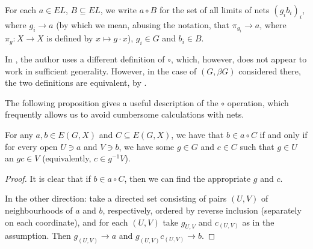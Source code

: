 	
	\begin{dfn}
		\label{dfn:circ}
		For each $a\in EL$, $B\subseteq EL$, we write $a\circ B$ for the set of all limits of nets $(g_ib_i)_i$, where $g_i\to a$ (by which we mean, abusing the notation, that $\pi_{g_i}\to a$, where $\pi_g\colon X\to X$ is defined by $x\mapsto g\cdot x$), $g_i\in G$ and $b_i\in B$.\xqed{\lozenge}
	\end{dfn}
	\begin{rem}
		\label{rem:circ_equivalence}
		In \cite{Gl76}, the author uses a different definition of $\circ$, which, however, does not appear to work in sufficient generality. However, in the case of $(G,\beta G)$ considered there, the two definitions are equivalent, by \cite[Lemma 1.1(1), \S IX.1.]{Gl76}.
		\xqed{\lozenge}
	\end{rem}
	The following proposition gives a useful description of the $\circ$ operation, which frequently allows us to avoid cumbersome calculations with nets.
	\begin{prop}
		\label{prop:circ_description}
		For any $a,b\in E(G,X)$ and $C\subseteq E(G,X)$, we have that $b\in a\circ C$ if and only if for every open $U\ni a$ and $V\ni b$, we have some $g\in G$ and $c\in C$ such that $g\in U$ an $gc\in V$ (equivalently, $c\in g^{-1}V$).
	\end{prop}
	\begin{proof}
		It is clear that if $b\in a\circ C$, then we can find the appropriate $g$ and $c$.
		
		In the other direction: take a directed set consisting of pairs $(U,V)$ of neighbourhoods of $a$ and $b$, respectively, ordered by reverse inclusion (separately on each coordinate), and for each $(U,V)$ take $g_{U,V}$ and $c_{(U,V)}$ as in the assumption. Then $g_{(U,V)}\to a$ and $g_{(U,V)}c_{(U,V)}\to b$.
	\end{proof}
	
